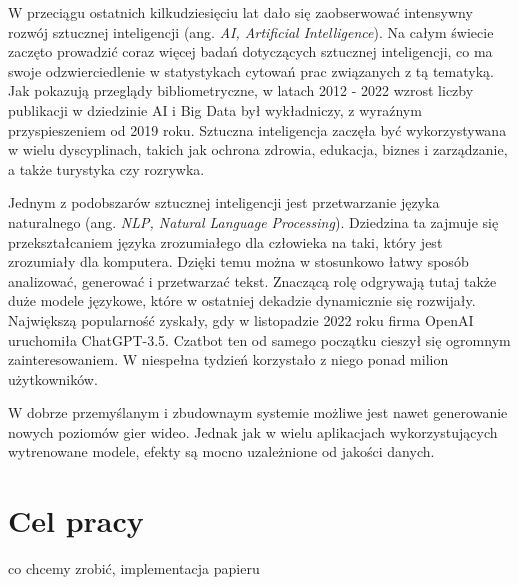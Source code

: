 W przeciągu ostatnich kilkudziesięciu lat dało się zaobserwować intensywny rozwój sztucznej inteligencji (ang. \textit{AI, Artificial Intelligence}). Na całym świecie zaczęto prowadzić coraz więcej badań dotyczących sztucznej inteligencji, co ma swoje odzwierciedlenie w statystykach cytowań prac związanych z tą tematyką. Jak pokazują przeglądy bibliometryczne, w latach 2012 - 2022 wzrost liczby publikacji w dziedzinie AI i Big Data był wykładniczy, z wyraźnym przyspieszeniem od 2019 roku\cite{p_v_thayyib_2023}. Sztuczna inteligencja zaczęła być wykorzystywana w wielu dyscyplinach, takich jak ochrona zdrowia, edukacja, biznes i zarządzanie, a także turystyka czy rozrywka. 

Jednym z podobszarów sztucznej inteligencji jest przetwarzanie języka naturalnego (ang. \textit{NLP, Natural Language Processing}). Dziedzina ta zajmuje się przekształcaniem języka zrozumiałego dla człowieka na taki, który jest zrozumiały dla komputera. Dzięki temu można w stosunkowo łatwy sposób analizować, generować i przetwarzać tekst. Znaczącą rolę odgrywają tutaj także duże modele językowe, które w ostatniej dekadzie dynamicznie się rozwijały. Największą popularność zyskały, gdy w listopadzie 2022 roku firma OpenAI uruchomiła ChatGPT-3.5. Czatbot ten od samego początku cieszył się ogromnym zainteresowaniem. W niespełna tydzień korzystało z niego ponad milion użytkowników\cite{ChatGPT2024}.

W dobrze przemyślanym i zbudownaym systemie możliwe jest nawet generowanie nowych poziomów gier wideo. Jednak jak w wielu aplikacjach wykorzystujących wytrenowane modele, efekty są mocno uzależnione od jakości danych\cite{Todd_2023}.


\section{Cel pracy}

co chcemy zrobić, implementacja papieru
